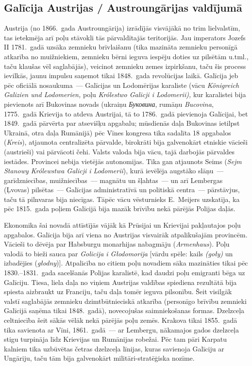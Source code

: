 \documentclass[twoside,a5paper,12pt,fleqn,openany]{extbook}
\newcommand{\pltxti}[1]{\textit{\textpolish{#1}}}
\newcommand{\detxti}[1]{\textit{\textgerman{#1}}}
\newcommand{\uktxti}[1]{\textit{\textukrainian{#1}}}
\newcommand{\rotxti}[1]{\textit{\textromanian{#1}}}
\begin{document}
\subsection{Galīcija Austrijas / Austroungārijas valdījumā}

Austrija (no 1866.~gada Austroungārija) izrādījās visvājākā no trim lielvalstīm, tas ietekmēja arī poļu stāvokli tās pārvaldītajās teritorijās. Jau imperators Jozefs II 1781.~gadā uzsāka zemnieku brīvlaišanu (tika mazināta zemnieku personīgā atkarība no muižniekiem, zemnieku bērni ieguva iespēju doties uz pilsētām u.tml., taču klaušas vēl saglabājās), veicinot zemnieku zemes izpirkšanu, taču šis process ievilkās, jaunu impulsu saņemot tikai 1848.~gada revolūcijas laikā. Galīcija jeb pēc oficiālā nosaukuma~--- Galīcijas un Lodomērijas karaliste (vācu \detxti{Königreich Galizien und Lodomerien,} poļu \pltxti{Królestwo Galicji i Lodomerii),} kur karalistei bija pievienots arī Bukovinas novads (ukraiņu \uktxti{Буковина}, rumāņu \rotxti{Bucovina}, 1775.~gadā Krievija to atdeva Austrijai, tā to 1786.~gadā pievienoja Galīcijai, bet 1849.~gadā pārvērta par atsevišķu apgabalu; mūsdienās daļa Bukovinas ietilpst Ukrainā, otra daļa Rumānijā) pēc Vīnes kongresa tika sadalīta 18 apgabalos (\detxti{Kreis}), atjaunota centralizēta pārvalde, birokrāti bija galvenokārt etniskie vācieši (austrieši) vai pārvācoti čehi. Valsts valoda bija vācu, tajā darbojās pārvaldes iestādes. Provincei nebija vietējās autonomijas. Tika gan atjaunots Seims (\pltxti{Sejm Stanowy Królewstwa Galicji i Lodomerii}), kurā ievēlēja augstāko slāņu~--- garīdzniecības, muižniecības~--- magnātu un šļahtas~--- un arī Lembergas (Ļvovas) pilsētas~--- Galīcijas administratīvā un politiskā centra~--- pārstāvjus, taču tā pilnvaras bija niecīgas. Tāpēc vācu vēsturnieks E.~Meijers uzskatīja, ka pēc 1815.~gada poļiem Galīcijā bija mazāk brīvību nekā pārējās Polijas daļās.

Ekonomika šai novadā attīstījās vājāk kā Prūsijai un Krievijai pakļautajos poļu apgabalos. Galīcija bija arī viena no Austrijas visvairāk atpalikušajām provincēm. Vācieši to dēvēja par Habsburgu monarhijas nabagmāju (\detxti{Armenhaus}). Poļu valodā to bieži sauca par \pltxti{Golicija i Głodomorija} [vārdu spēle: kails \pltxti{(goły)} un izbadējies (\pltxti{głodny})]. Atpalicība no citiem poļu novadiem sāka mazināties tikai pēc 1830.--1831.~gada sacelšanās Polijas karalistē, kad daudzi poļu emigranti bēga uz Galīciju. Tiesa, liela daļa no viņiem Austrijas valdības spiediena rezultātā bija spiesta aizbraukt uz Franciju, taču daļa tomēr ieguva pilsonību. Šeit visilgāk valstī saglabājās zemnieku dzimtbūtnieciskā atkarība (personīgo brīvību zemnieki Galīcijā saņēma tikai 1848.~gadā), novecojušas saimniekošanas formas. Dzelzceļa celtniecība šeit sākās vēlāk nekā pārējās poļu zemēs. Krakova tikai 1855.~gadā tika savienota ar Vīni, 1861.~gadā~--- ar Lembergu, nākamajos gados dzelzceļa stigu turpināja līdz Krievijas un Rumānijas robežai. Pēc tam pāri Karpatu kalniem tika uzbūvētas četras dzelzceļa līnijas, kuras savienoja Galīciju ar Ungāriju, taču tām bija galvenokārt militāri-stratēģiska nozīme.
\end{document}

